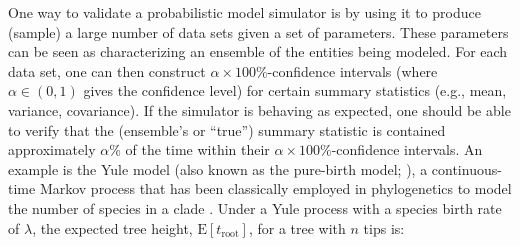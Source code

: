 \documentclass[oneside]{article}
\begin{document}
One way to validate a probabilistic model simulator is by using it to produce (sample) a large number of data sets given a set of parameters.
These parameters can be seen as characterizing an ensemble of the entities being modeled.
For each data set, one can then construct $\alpha \times 100 \%$-confidence intervals (where $\alpha \in (0,1)$ gives the confidence level) for certain summary statistics (e.g., mean, variance, covariance).
If the simulator is behaving as expected, one should be able to verify that the (ensemble's or ``true'') summary statistic is contained approximately $\alpha$\% of the time within their $\alpha \times 100\%$-confidence intervals.
An example is the Yule model (also known as the pure-birth model; \citealt{yule24}), a continuous-time Markov process that has been classically employed in phylogenetics to model the number of species in a clade \citep{yule24,aldous01}.
Under a Yule process with a species birth rate of $\lambda$, the expected tree height, $\text{E}[t_{\text{root}}]$, for a tree with $n$ tips is:
\vspace{.5cm}
\end{document}
